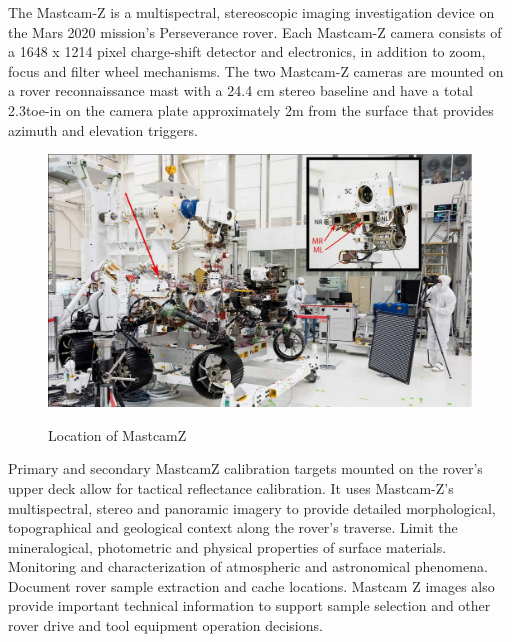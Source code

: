 The Mastcam-Z is a multispectral, stereoscopic imaging investigation device on the Mars 2020 mission's Perseverance rover. Each Mastcam-Z camera consists of a 1648 x 1214 pixel charge-shift detector and electronics, in addition to zoom, focus and filter wheel mechanisms. The two Mastcam-Z cameras are mounted on a rover reconnaissance mast with a 24.4 cm stereo baseline and have a total 2.3\degree toe-in on the camera plate approximately 2m from the surface that provides azimuth and elevation triggers. 
\begin{figure}[H]
	\centering
	\includegraphics[scale=0.3]{img/mastcamlocation.png}
	\label{fig:mastcamLocation}
	\caption{Location of MastcamZ}
\end{figure}
Primary and secondary MastcamZ calibration targets mounted on the rover's upper deck allow for tactical reflectance calibration. It uses Mastcam-Z's multispectral, stereo and panoramic imagery to provide detailed morphological, topographical and geological context along the rover's traverse. Limit the mineralogical, photometric and physical properties of surface materials. Monitoring and characterization of atmospheric and astronomical phenomena. Document rover sample extraction and cache locations. Mastcam Z images  also provide important technical information to support sample selection and other rover drive and tool equipment operation decisions.

